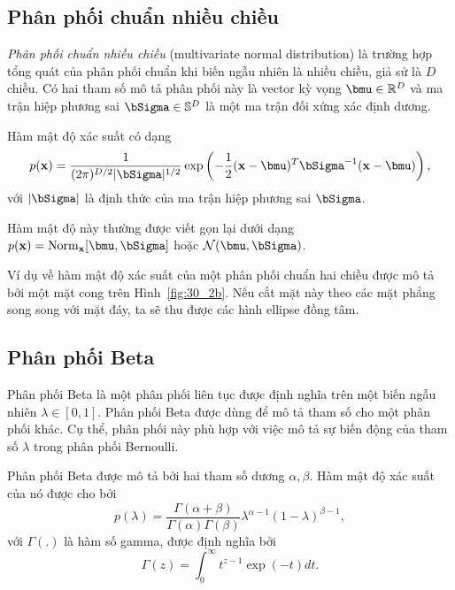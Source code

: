 \subsection{Phân phối chuẩn nhiều chiều}

\textit{Phân phối chuẩn nhiều chiều} (multivariate normal distribution) là trường hợp tổng quát của phân phối chuẩn khi biến
ngẫu nhiên là nhiều chiều, giả sử là $D$ chiều. Có hai tham số mô tả phân phối
này là {vector kỳ vọng} $\bmu \in \mathbb{R}^D$ và {ma trận hiệp phương sai}
$\bSigma \in \mathbb{S}^D$ là một ma trận {đối xứng xác định dương}.

\newpage 
Hàm mật độ xác suất có dạng
\begin{equation}
\label{eqn:30_33}
  p(\mathbf{x}) = \frac{1}{(2\pi)^{D/2} |\bSigma|^{1/2}} \exp \left(-\frac{1}{2}
  (\mathbf{x} - \bmu)^T \bSigma^{-1} (\mathbf{x} - \bmu)\right),
\end{equation}
với $|\bSigma|$ là định thức của ma trận hiệp phương sai $\bSigma$.

Hàm mật độ này thường được viết gọn lại dưới dạng 
  $p(\mathbf{x}) = \text{Norm}_{\mathbf{x}}[\bmu, \bSigma]$ hoặc
  $\mathcal{N}(\bmu, \bSigma)$.

Ví dụ về hàm mật độ xác suất của một phân phối chuẩn hai chiều được mô tả bởi
một mặt cong trên Hình~\ref{fig:30_2b}. Nếu cắt mặt này theo các mặt phẳng
song song với mặt đáy, ta sẽ thu được các hình ellipse đồng tâm.

\subsection{Phân phối Beta}
Phân phối Beta là một phân phối liên tục được định nghĩa trên một biến ngẫu
nhiên $\lambda \in [0, 1]$. Phân phối Beta được dùng để mô tả {tham số} cho một
phân phối khác. Cụ thể, phân phối này phù hợp với việc mô tả sự {biến động} của
tham số $\lambda$ trong phân phối Bernoulli.

Phân phối Beta được mô tả bởi hai tham số {dương} $\alpha, \beta$. Hàm
mật độ xác suất của nó được cho bởi
\begin{equation}
\label{eqn:30_34}
  p(\lambda) = \frac{\Gamma(\alpha + \beta)}{\Gamma(\alpha) \Gamma(\beta)} \lambda^{\alpha - 1} ( 1 - \lambda) ^{\beta - 1},
\end{equation}
với $\Gamma(.)$ là hàm số gamma, được định nghĩa bởi
\begin{equation}
  \Gamma(z) = \int_0^{\infty} t^{z-1}\exp(-t) dt.
\end{equation}

